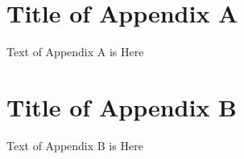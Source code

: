 \newpage
\appendix
\section{Title of Appendix A} \label{App:AppendixA}

Text of Appendix A is Here

\newpage
\section{Title of Appendix B} \label{App:AppendixB}

Text of Appendix B is Here